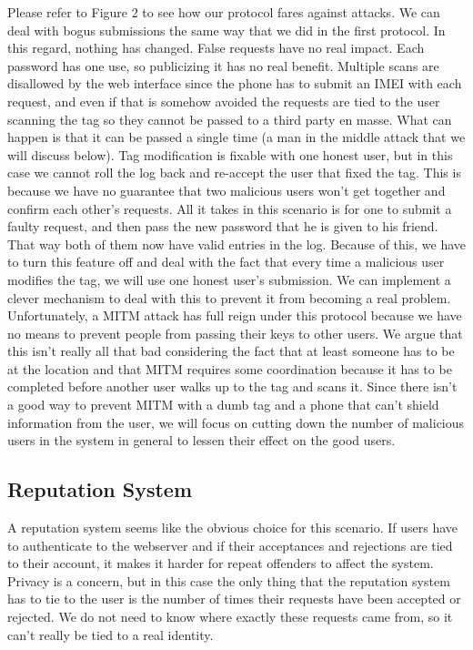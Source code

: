 \documentclass{sig-alternate}
\begin{document}
Please refer to Figure 2 to see how our protocol fares against
attacks. We can deal with bogus submissions the same way that we did
in the first protocol. In this regard, nothing has changed. False
requests have no real impact. Each password has one use, so
publicizing it has no real benefit. Multiple scans are disallowed by
the web interface since the phone has to submit an IMEI with each
request, and even if that is somehow avoided the requests are tied to
the user scanning the tag so they cannot be passed to a third party en
masse. What can happen is that it can be passed a single time (a man
in the middle attack that we will discuss below). Tag modification is
fixable with one honest user, but in this case we cannot roll the log
back and re-accept the user that fixed the tag. This is because we
have no guarantee that two malicious users won't get together and
confirm each other's requests. All it takes in this scenario is for
one to submit a faulty request, and then pass the new password that he
is given to his friend. That way both of them now have valid entries
in the log. Because of this, we have to turn this feature off and deal
with the fact that every time a malicious user modifies the tag, we
will use one honest user's submission. We can implement a clever
mechanism to deal with this to prevent it from becoming a real
problem. Unfortunately, a MITM attack has full reign under this
protocol because we have no means to prevent people from passing their
keys to other users. We argue that this isn't really all that bad
considering the fact that at least someone has to be at the location
and that MITM requires some coordination because it has to be
completed before another user walks up to the tag and scans it. Since
there isn't a good way to prevent MITM with a dumb tag and a phone
that can't shield information from the user, we will focus on cutting
down the number of malicious users in the system in general to lessen
their effect on the good users.

\subsection{Reputation System}
A reputation system seems like the obvious choice for this
scenario. If users have to authenticate to the webserver and if their
acceptances and rejections are tied to their account, it makes it
harder for repeat offenders to affect the system. Privacy is a
concern, but in this case the only thing that the reputation system
has to tie to the user is the number of times their requests have been
accepted or rejected. We do not need to know where exactly these
requests came from, so it can't really be tied to a real identity.
\end{document}
